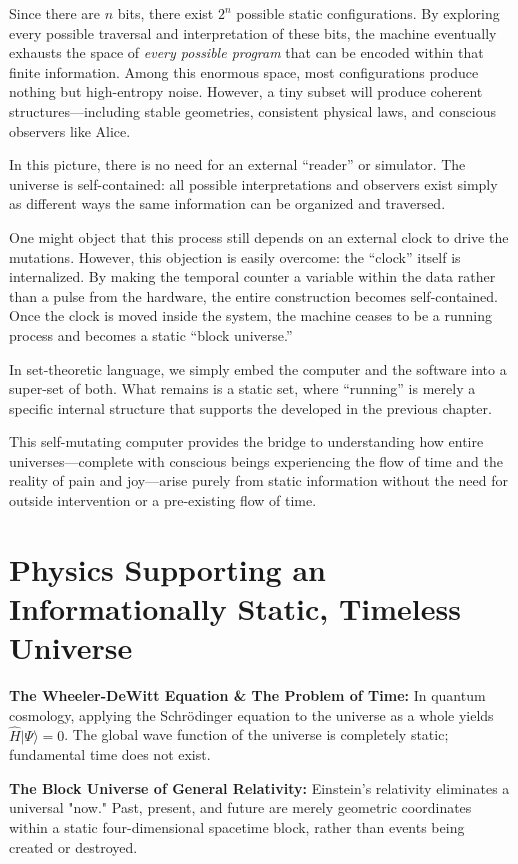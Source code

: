 Since there are $n$ bits, there exist $2^n$ possible static configurations. 
By exploring every possible traversal and interpretation of these bits, the machine eventually exhausts the space of \emph{every possible program} that can be encoded within that finite information. 
Among this enormous space, most configurations produce nothing but high-entropy noise. 
However, a tiny subset will produce coherent structures---including stable geometries, consistent physical laws, and conscious observers like Alice.

In this picture, there is no need for an external ``reader'' or simulator. 
The universe is self-contained: all possible interpretations and observers exist simply as different ways the same information can be organized and traversed.

One might object that this process still depends on an external clock to drive the mutations. 
However, this objection is easily overcome: the ``clock'' itself is internalized. 
By making the temporal counter a variable within the data rather than a pulse from the hardware, the entire construction becomes self-contained. 
Once the clock is moved inside the system, the machine ceases to be a running process and becomes a static ``block universe.''

In set-theoretic language, we simply embed the computer and the software into a super-set of both. 
What remains is a static set, where ``running'' is merely a specific internal structure that supports the  developed in the previous chapter. 

This self-mutating computer provides the bridge to understanding how entire universes---complete with conscious beings experiencing the flow of time and the reality of pain and joy---arise purely from static information without the need for outside intervention or a pre-existing flow of time.


\section{Physics Supporting an Informationally Static, Timeless Universe}

\textbf{The Wheeler-DeWitt Equation \& The Problem of Time:} In quantum cosmology, applying the Schrödinger equation to the universe as a whole yields $\hat{H}|\Psi\rangle = 0$. The global wave function of the universe is completely static; fundamental time does not exist.

\textbf{The Block Universe of General Relativity:} Einstein’s relativity eliminates a universal "now." Past, present, and future are merely geometric coordinates within a static four-dimensional spacetime block, rather than events being created or destroyed.

